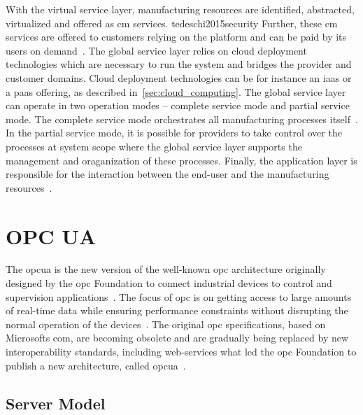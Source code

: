 \documentclass[
a4paper,
twoside,
headsepline,
cleardoublepage=empty,
parskip=half,
draft=false
]{scrbook}
\begin{document}
			With the virtual service layer, manufacturing resources are identified, abstracted, virtualized and offered as \gls{cm} services. tedeschi2015security
			Further, these \gls{cm} services are offered to customers relying on the platform and can be paid by its users on demand~\cite{tedeschi2015security}.
			The global service layer relies on cloud deployment technologies which are necessary to run the system and bridges the provider and customer domains.
			Cloud deployment technologies can be for instance an \gls{iaas} or a \gls{paas} offering, as described in~\cref{sec:cloud_computing}. 
			The global service layer can operate in two operation modes -- complete service mode and partial service mode. 
			The complete service mode orchestrates all manufacturing processes itself~\cite{xu2012cloud}.
			In the partial service mode, it is possible for providers to take control over the processes at system scope where the global service layer supports the management and oraganization of these processes. 
			Finally, the application layer is responsible for the interaction between the end-user and the manufacturing resources~\cite{xu2012cloud}. 
		
		\section{OPC UA} \label{sec:opc_ua}
		
			The \gls{opcua} is the new version of the well-known \gls{opc} architecture originally designed by the \gls{opc} Foundation to
			connect industrial devices to control and supervision applications~\cite{hadlich2006providing}. The focus of \gls{opc} is on getting access to large amounts of real-time data while ensuring performance constraints without disrupting the normal operation of the devices~\cite{candido2010soa}.
			The original \gls{opc} specifications, based on Microsofts \gls{com}, are becoming obsolete and are gradually being replaced by new interoperability standards, including web-services what led the \gls{opc} Foundation to publish a new architecture, called \gls{opcua}~\cite{hadlich2006providing}.
			
			\subsection{Server Model}\label{subsec:opc_ua_server_model}
			
\end{document}
